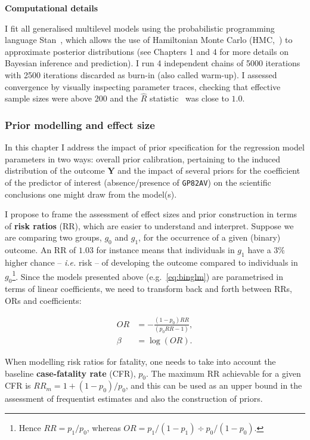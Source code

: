 \textbf{Computational details}

I fit all generalised multilevel models using the probabilistic programming language Stan~\citep{Carpenter2017}, which allows the use  of Hamiltonian Monte Carlo (HMC,~\cite{Neal2011}) to approximate posterior distributions (see Chapters 1 and 4 for more details on Bayesian inference and prediction).
I run 4 independent chains of 5000 iterations with 2500 iterations discarded as burn-in (also called warm-up).
I assessed convergence by visually inspecting parameter traces, checking that effective sample sizes were above $200$ and the $\hat{R}$ statistic~\citep{Brooks1998} was close to $1.0$.

\subsubsection{Prior modelling and effect size}
\label{sec:priors}

In this chapter I address the impact of prior specification for the regression model parameters in two ways: overall prior calibration, pertaining to the induced distribution of the outcome $\boldsymbol Y$ and the impact of several priors for the coefficient of the predictor of interest (absence/presence of \verb|GP82AV|) on the scientific conclusions one might draw from the model(s).

I propose to frame the assessment of effect sizes and prior construction in terms of \textbf{risk ratios} (RR), which are easier to understand and interpret.
Suppose we are comparing two groups, $g_0$ and $g_1$, for the occurrence of a given (binary) outcome.
An RR  of $1.03$ for instance means that individuals in $g_1$ have a $3\%$ higher chance -- \textit{i.e.} risk --  of developing the outcome compared to individuals in $g_0$\footnote{Hence $RR = p_1/p_0$, whereas $OR = p_1/(1-p_1) \div p_0/(1-p_0)$.}.
Since the models presented above (e.g.~\ref{eq:binglm}) are parametrised in terms of linear coefficients, we need to transform back and forth between RRs, ORs and coefficients:

\begin{align}
\label{eq:ORRRa}
 OR &= -\frac{(1-p_0)RR}{(p_0 RR -1)}, \\
 \label{eq:ORRRb}
 \beta &= \log(OR).
\end{align}

When modelling risk ratios for fatality, one needs to take into account the baseline \textbf{case-fatality rate} (CFR), $p_0$.
The maximum RR achievable for a given CFR is $RR_m = 1 + (1-p_0)/p_0$, and this can be used as an upper bound in the assessment of frequentist estimates and also the construction of priors.


